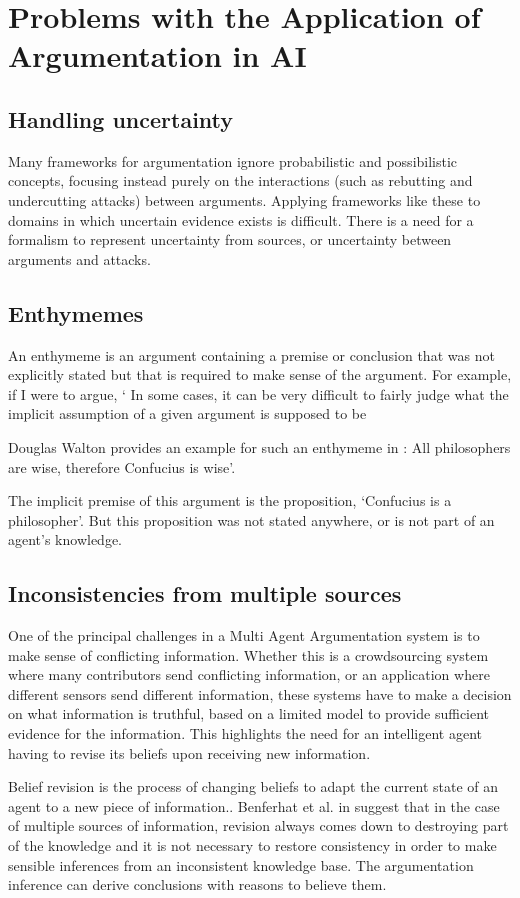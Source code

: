 \documentclass[sigconf]{acmart}
\begin{document}
\section{Problems with the Application of Argumentation in AI}
\subsection{Handling uncertainty}
Many frameworks for argumentation ignore probabilistic and
possibilistic concepts, focusing instead purely on the interactions (such as rebutting and undercutting attacks) between arguments. Applying frameworks like these to domains in which uncertain evidence exists is difficult. There is a need for a formalism to represent uncertainty from sources, or uncertainty between arguments and attacks.

\subsection{Enthymemes}
An enthymeme is an argument containing a premise or
conclusion that was not explicitly stated but that is required to make sense of the
argument. For example, if I were to argue, ‘ In some cases, it can be very difficult to fairly judge what the implicit assumption of a given argument is supposed to be

Douglas Walton provides an example for such an enthymeme in \cite{walton2005argumentation}: All philosophers are wise, therefore Confucius is wise’. 

The implicit premise of this argument is the proposition, ‘Confucius is a philosopher’. But this proposition was not stated anywhere, or is not part of an agent's knowledge.
\subsection{Inconsistencies from multiple sources}

One of the principal challenges in a Multi Agent Argumentation system is to make sense of conflicting information. Whether this is a crowdsourcing system where many
contributors send conflicting information, or an application where different sensors
send different information, these systems have to make a decision on what information is truthful, based on a limited model to provide sufficient evidence for the information. This highlights the need for an intelligent agent having to revise its beliefs upon receiving new information.


Belief revision is the process of changing beliefs to adapt the current state of an agent to a new piece of information.\cite{rahwan2009argumentation}. Benferhat et al. in \cite{benferhat1995infer} suggest that in the case of multiple sources of information, revision always comes down to destroying part of the knowledge and it is not necessary to restore consistency in order to make sensible inferences from an inconsistent knowledge base. The argumentation inference can derive conclusions with reasons to believe them. 
\end{document}
